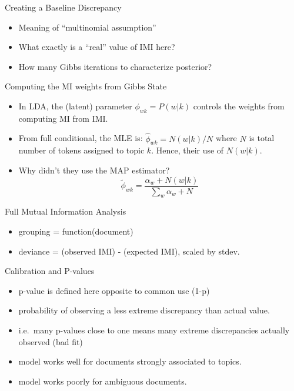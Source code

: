 \documentclass{beamer}
\begin{document}
\begin{frame}{Creating a Baseline Discrepancy}

\begin{itemize}
\item
  Meaning of ``multinomial assumption''
\item
  What exactly is a ``real'' value of IMI here?
\item
  How many Gibbs iterations to characterize posterior?
\end{itemize}

\end{frame}

\begin{frame}{Computing the MI weights from Gibbs State}

\begin{itemize}
\item
  In LDA, the (latent) parameter \(\phi_{wk}=P(w|k)\) controls the
  weights from computing MI from IMI.
\item
  From full conditional, the MLE is: \(\hat{\phi}_{wk} = N(w|k)/N\)
  where \(N\) is total number of tokens assigned to topic \(k\). Hence,
  their use of \(N(w|k)\).
\item
  Why didn't they use the MAP estimator?
  \[\tilde{\phi}_{wk} = \frac{\alpha_w+N(w|k)}{\sum_w \alpha_w + N}\]
\end{itemize}

\end{frame}

\begin{frame}{Full Mutual Information Analysis}

\begin{itemize}

\item
  grouping = function(document)
\item
  deviance = (observed IMI) - (expected IMI), scaled by stdev.
\end{itemize}

\end{frame}

\begin{frame}{Calibration and P-values}

\begin{itemize}
\item
  p-value is defined here opposite to common use (1-p)
\item
  probability of observing a less extreme discrepancy than actual value.
\item
  i.e.~many p-values close to one means many extreme discrepancies
  actually observed (bad fit)
\item
  model works well for documents strongly associated to topics.
\item
  model works poorly for ambiguous documents.
\end{itemize}

\end{frame}
\end{document}
